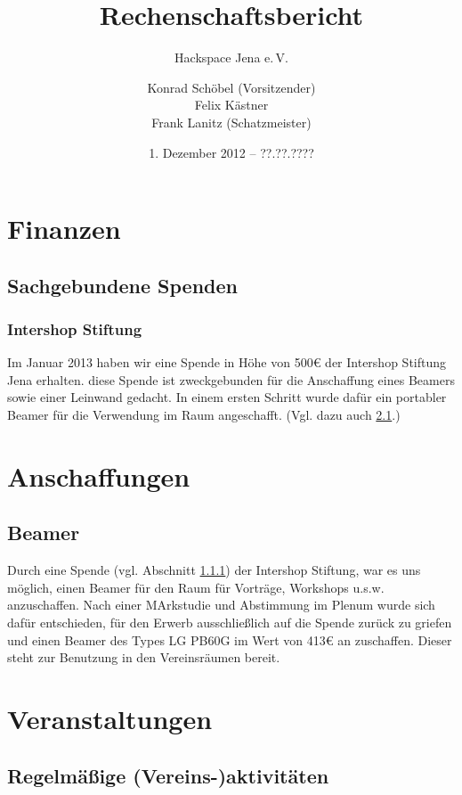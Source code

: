 \documentclass[10pt,DIV16]{scrartcl}
\title{Rechenschaftsbericht}
\subtitle{Hackspace Jena e.\,V.}
\author{%
	Konrad Schöbel (Vorsitzender)\\
	Felix Kästner\\
	Frank Lanitz (Schatzmeister)
}
\date{1. Dezember 2012 -- ??.??.????}
\begin{document}
\maketitle{}

\tableofcontents{}

\newpage{}

\section{Finanzen}

\subsection{Sachgebundene Spenden}
\subsubsection{Intershop Stiftung}
\label{sec:iss-spende}
Im Januar 2013 haben wir eine Spende in Höhe von 500\euro{} der Intershop
Stiftung Jena erhalten. diese Spende ist zweckgebunden für die
Anschaffung eines Beamers sowie einer Leinwand gedacht. In einem
ersten Schritt wurde dafür ein portabler Beamer für die Verwendung
im Raum angeschafft. (Vgl. dazu auch \ref{sec:beamerkauf}.)

\section{Anschaffungen}

\subsection{Beamer}
\label{sec:beamerkauf}

Durch eine Spende (vgl. Abschnitt \ref{sec:iss-spende}) der
Intershop Stiftung, war es uns möglich, einen Beamer für den Raum
für Vorträge, Workshops u.s.w. anzuschaffen. Nach einer MArkstudie
und Abstimmung im Plenum wurde sich dafür entschieden, für den
Erwerb ausschließlich auf die Spende zurück zu griefen und einen
Beamer des Types LG PB60G im Wert von 413\euro{} an zuschaffen. Dieser
steht zur Benutzung in den Vereinsräumen bereit.


\section{Veranstaltungen}

\subsection{Regelmäßige (Vereins-)aktivitäten}
\end{document}
